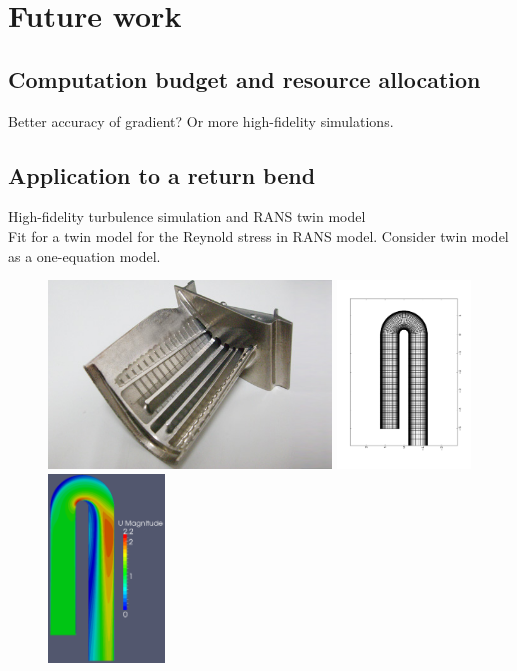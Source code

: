 \documentclass[a4paper,onecolumn]{article}
\theoremstyle{remark}
\begin{document}
\newpage
\section{Future work}
\subsection{Computation budget and resource allocation}
Better accuracy of gradient? Or more high-fidelity simulations.
\subsection{Application to a return bend }
\label{examples}
High-fidelity turbulence simulation and RANS twin model\\
Fit for a twin model for the Reynold stress in RANS model.
Consider twin model as a one-equation model.
\begin{figure}[H]
    \includegraphics[height=5cm]{ubend.png}
    \includegraphics[height=5cm]{overall_mesh.png}
    \includegraphics[height=5cm]{OpenFOAM_mesh.png}
\end{figure}
\end{document}
